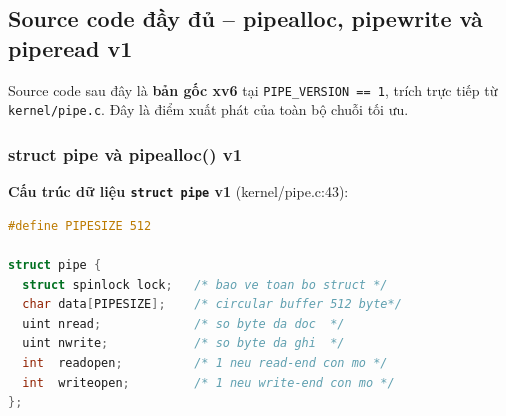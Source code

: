 \documentclass[12pt,a4paper]{article}
\newcommand{\code}[1]{\texttt{#1}}
\newcommand{\tightlist}{\setlength{\itemsep}{2pt}\setlength{\parskip}{0pt}}
\begin{document}

\subsection{Source code đầy đủ -- pipealloc, pipewrite và piperead v1}
\label{ssec:v1src}

Source code sau đây là \textbf{bản gốc xv6} tại \code{PIPE\_VERSION == 1},
trích trực tiếp từ \code{kernel/pipe.c}.
Đây là điểm xuất phát của toàn bộ chuỗi tối ưu.

\subsubsection{struct pipe và pipealloc() v1}

\textbf{Cấu trúc dữ liệu \code{struct pipe} v1} (kernel/pipe.c:43):

\begin{lstlisting}[caption={struct pipe v1 -- buffer nhúng 512 byte (kernel/pipe.c:43)},
                   language=C, label={lst:pipe_struct_v1}]
#define PIPESIZE 512

struct pipe {
  struct spinlock lock;   /* bao ve toan bo struct */
  char data[PIPESIZE];    /* circular buffer 512 byte*/
  uint nread;             /* so byte da doc  */
  uint nwrite;            /* so byte da ghi  */
  int  readopen;          /* 1 neu read-end con mo */
  int  writeopen;         /* 1 neu write-end con mo */
};
\end{lstlisting}
\end{document}
